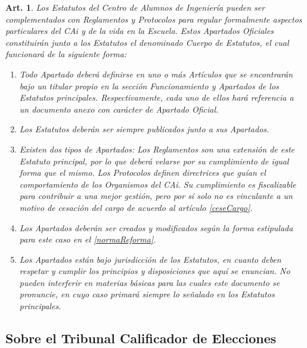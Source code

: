 \documentclass[letterpaper,11pt]{article}
\theoremstyle{plain}
\newtheorem{art}{Art.} %
\newcommand{\aref}[1]{\hyperref[#1]{\ref*{#1}}}
\begin{document}
		\begin{art}\label{definicionApartados}
			Los Estatutos del Centro de Alumnos de Ingeniería pueden ser complementados con Reglamentos y Protocolos para regular formalmente aspectos particulares del CAi y de la vida en la Escuela. Estos Apartados Oficiales constituirán junto a los Estatutos el denominado Cuerpo de Estatutos, el cual funcionará de la siguiente forma:
			\begin{enumerate}
				\item Todo Apartado deberá definirse en uno o más Artículos que se encontrarán bajo un titular propio en la sección Funcionamiento y Apartados de los Estatutos principales. Respectivamente, cada uno de ellos hará referencia a un documento anexo con carácter de Apartado Oficial.
				\item Los Estatutos deberán ser siempre publicados junto a sus Apartados.
				\item Existen dos tipos de Apartados: Los Reglamentos son una extensión de este Estatuto principal, por lo que deberá velarse por su cumplimiento de igual forma que el mismo. Los Protocolos definen directrices que guían el comportamiento de los Organismos del CAi. Su cumplimiento es fiscalizable para contribuir a una mejor gestión, pero por sí solo no es vinculante a un motivo de cesación del cargo de acuerdo al artículo \aref{ceseCargo}.
				\item Los Apartados deberán ser creados y modificados según la forma estipulada para este caso en el \aref{normaReforma}.
				\item Los Apartados están bajo jurisdicción de los Estatutos, en cuanto deben respetar y cumplir los principios y disposiciones que aquí se enuncian. No pueden interferir en materias básicas para las cuales este documento se pronuncie, en cuyo caso primará siempre lo señalado en los Estatutos principales.
			\end{enumerate}
		\end{art}

		\subsection*{Sobre el Tribunal Calificador de Elecciones}
\end{document}
